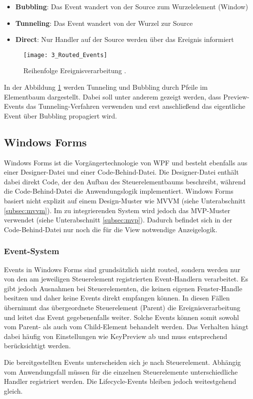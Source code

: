 \begin{itemize}
    \item \textbf{Bubbling}: Das Event wandert von der Source zum Wurzelelement (Window)
    \item \textbf{Tunneling}: Das Event wandert von der Wurzel zur Source
    \item \textbf{Direct}: Nur Handler auf der Source werden über das Ereignis informiert
\end{itemize}

\begin{figure}[H]
    \centering
    \texttt{[image: 3\_Routed\_Events]}
    \caption{Reihenfolge Ereignisverarbeitung \cite{microsoft_wpf_routed_events_overview}.}
    \label{fig:routed_events}
\end{figure}

In der Abbildung \ref{fig:routed_events} werden Tunneling und Bubbling durch Pfeile im Elementbaum dargestellt. Dabei soll unter anderem gezeigt werden, dass Preview-Events das Tunneling-Verfahren verwenden und erst anschließend das eigentliche Event über Bubbling propagiert wird.

\subsection{Windows Forms}
\label{subsec:Winforms}
Windows Forms \cite{microsoft_winforms_overview} ist die Vorgängertechnologie von WPF und besteht ebenfalls aus einer Designer-Datei und einer Code-Behind-Datei. Die Designer-Datei enthält dabei direkt Code, der den Aufbau des Steuerelementbaums beschreibt, während die Code-Behind-Datei die Anwendungslogik implementiert. Windows Forms basiert nicht explizit auf einem Design-Muster wie MVVM (siehe Unterabschnitt \ref{subsec:mvvm}). Im zu integrierenden System wird jedoch das MVP-Muster verwendet (siehe Unterabschnitt \ref{subsec:mvp}). Dadurch befindet sich in der Code-Behind-Datei nur noch die für die View notwendige Anzeigelogik.

\subsubsection{Event-System}
Events in Windows Forms \cite{microsoft_winforms_events_overview} sind grundsätzlich nicht routed, sondern werden nur von den am jeweiligen Steuerelement registrierten Event-Handlern verarbeitet. Es gibt jedoch Ausnahmen bei Steuerelementen, die keinen eigenen Fenster-Handle besitzen und daher keine Events direkt empfangen können. In diesen Fällen übernimmt das übergeordnete Steuerelement (Parent) die Ereignisverarbeitung und leitet das Event gegebenenfalls weiter. Solche Events können somit sowohl vom Parent- als auch vom Child-Element behandelt werden. Das Verhalten hängt dabei häufig von Einstellungen wie KeyPreview \cite{microsoft_form_keypreview} ab und muss entsprechend berücksichtigt werden.

Die bereitgestellten Events unterscheiden sich je nach Steuerelement. Abhängig vom Anwendungsfall müssen für die einzelnen Steuerelemente unterschiedliche Handler registriert werden. Die Lifecycle-Events bleiben jedoch weitestgehend gleich.





